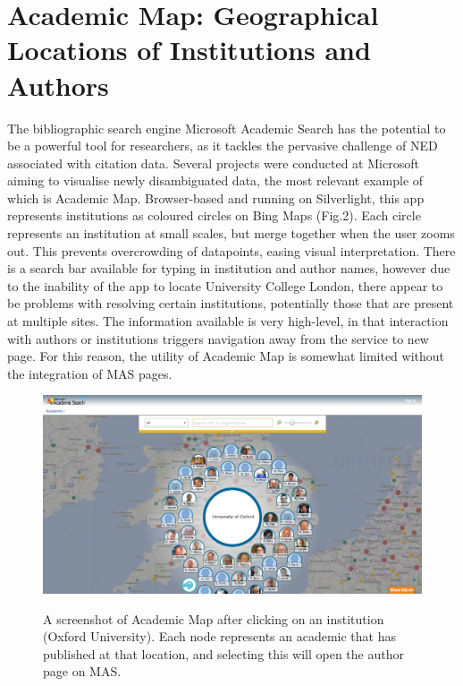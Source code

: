 \documentclass[PROP_AGutteridge_CS.tex]{subfiles}
\begin{document}
\section{Academic Map: Geographical Locations of Institutions and Authors}
The bibliographic search engine Microsoft Academic Search has the potential to be a powerful tool for researchers, as it tackles the pervasive challenge of NED associated with citation data. Several projects were conducted at Microsoft aiming to visualise newly disambiguated data, the most relevant example of which is Academic Map. Browser-based and running on Silverlight, this app represents institutions as coloured circles on Bing Maps (Fig.2). Each circle represents an institution at small scales, but merge together when the user zooms out. This prevents overcrowding of datapoints, easing visual interpretation. There is a search bar available for typing in institution and author names, however due to the inability of the app to locate University College London, there appear to be problems with resolving certain institutions, potentially those that are present at multiple sites. The information available is very high-level, in that interaction with authors or institutions triggers navigation away from the service to new page. For this reason, the utility of Academic Map is somewhat limited without the integration of MAS pages. \\

\begin{figure}[ht]
	\includegraphics[width=\textwidth]{../lib/images/AM}
	\label{fig:AM}
\caption{A screenshot of Academic Map after clicking on an institution (Oxford University). Each node represents an academic that has published at that location, and selecting this will open the author page on MAS.}
\end{figure}
\end{document}
